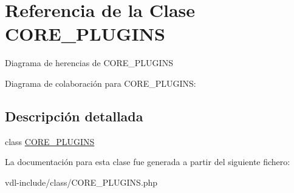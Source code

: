 \hypertarget{class_c_o_r_e___p_l_u_g_i_n_s}{\section{Referencia de la Clase C\-O\-R\-E\-\_\-\-P\-L\-U\-G\-I\-N\-S}
\label{class_c_o_r_e___p_l_u_g_i_n_s}
}


Diagrama de herencias de C\-O\-R\-E\-\_\-\-P\-L\-U\-G\-I\-N\-S


Diagrama de colaboración para C\-O\-R\-E\-\_\-\-P\-L\-U\-G\-I\-N\-S\-:


\subsection{Descripción detallada}
class \hyperlink{class_c_o_r_e___p_l_u_g_i_n_s}{C\-O\-R\-E\-\_\-\-P\-L\-U\-G\-I\-N\-S} 

La documentación para esta clase fue generada a partir del siguiente fichero\-:\begin{DoxyCompactItemize}
\item 
vdl-\/include/class/C\-O\-R\-E\-\_\-\-P\-L\-U\-G\-I\-N\-S.\-php\end{DoxyCompactItemize}
